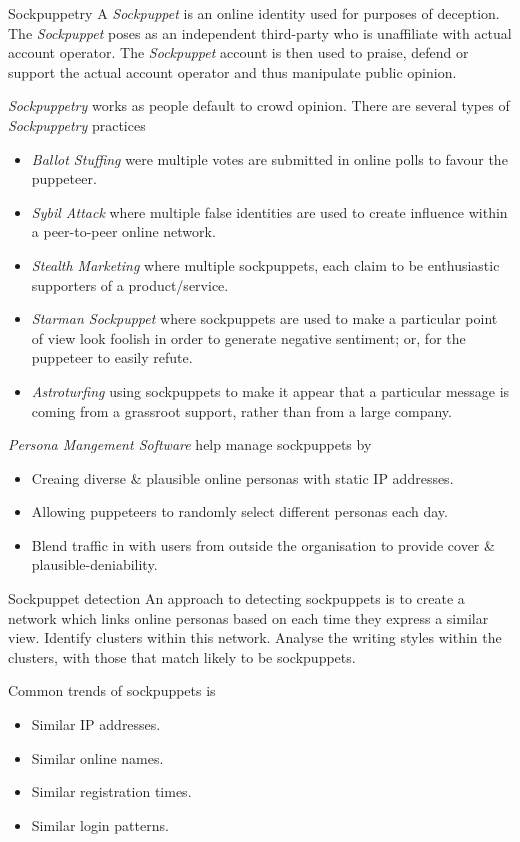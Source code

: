 \documentclass[11pt,a4paper]{article}
\begin{document}
\begin{definition}{Sockpuppetry}
  A \textit{Sockpuppet} is an online identity used for purposes of deception. The \textit{Sockpuppet} poses as an independent third-party who is unaffiliate with actual account operator. The \textit{Sockpuppet} account is then used to praise, defend or support the actual account operator and thus manipulate public opinion.
  \par \textit{Sockpuppetry} works as people default to crowd opinion. There are several types of \textit{Sockpuppetry} practices
  \begin{itemize}
    \item \textit{Ballot Stuffing} were multiple votes are submitted in online polls to favour the puppeteer.
    \item \textit{Sybil Attack} where multiple false identities are used to create influence within a peer-to-peer online network.
    \item \textit{Stealth Marketing} where multiple sockpuppets, each claim to be enthusiastic supporters of a product/service.
    \item \textit{Starman Sockpuppet} where sockpuppets are used to make a particular point of view look foolish in order to generate negative sentiment; or, for the puppeteer to easily refute.
    \item \textit{Astroturfing} using sockpuppets to make it appear that a particular message is coming from a grassroot support, rather than from a large company.
  \end{itemize}
  \textit{Persona Mangement Software} help manage sockpuppets by
  \begin{itemize}
    \item Creaing diverse \& plausible online personas with static IP addresses.
    \item Allowing puppeteers to randomly select different personas each day.
    \item Blend traffic in with users from outside the organisation to provide cover \& plausible-deniability.
  \end{itemize}
\end{definition}

\begin{proposition}{Sockpuppet detection}
  An approach to detecting sockpuppets is to create a network which links online personas based on each time they express a similar view. Identify clusters within this network. Analyse the writing styles within the clusters, with those that match likely to be sockpuppets.
  \par Common trends of sockpuppets is
  \begin{itemize}
    \item Similar IP addresses.
    \item Similar online names.
    \item Similar registration times.
    \item Similar login patterns.
  \end{itemize}
\end{proposition}
\end{document}
